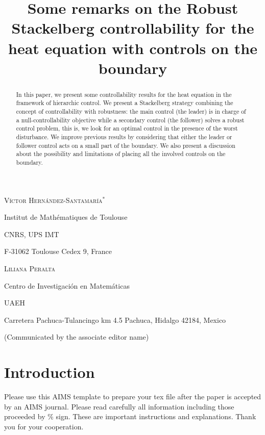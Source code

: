 \documentclass{aims}
\title[Robust Stackelberg controllability for the heat equation] %
      {Some remarks on the Robust Stackelberg controllability for the heat equation with controls on the boundary}
\author[V\'ictor Hern\'andez-Santamar\'ia and Liliana Peralta]{}
\theoremstyle{definition}
\begin{document}
\maketitle

\centerline{\scshape V\'ictor Hern\'andez-Santamar\'ia$^*$}
\medskip
{\footnotesize
 \centerline{Institut de Math\'{e}matiques de
    Toulouse}
   \centerline{CNRS, UPS IMT}
   \centerline{F-31062 Toulouse Cedex 9,
    France}
} %

\medskip

\centerline{\scshape Liliana Peralta}
\medskip
{\footnotesize
 \centerline{Centro de Investigaci\'on en Matem\'aticas}
   \centerline{UAEH}
   \centerline{Carretera Pachuca-Tulancingo km 4.5 Pachuca, Hidalgo 42184, Mexico}
}

\bigskip

 \centerline{(Communicated by the associate editor name)}


\begin{abstract}
In this paper, we present some controllability results for the heat equation in the framework of hierarchic control. We present a Stackelberg strategy combining the concept of controllability with robustness: the main control (the leader) is in charge of a null-controllability objective while a secondary control (the follower) solves a robust control problem, this is, we look for an optimal control in the presence of the worst disturbance. We improve previous results by considering that either the leader or follower control acts on a small part of the boundary.  We also present a discussion about the possibility and limitations of placing all the involved controls on the boundary. 
\end{abstract}

\section{Introduction}

Please use this AIMS template to prepare your tex file after the
paper is accepted by an AIMS journal. Please read carefully all
information including those proceeded by \% sign. These are
important instructions and explanations. Thank you for your
cooperation.
\end{document}
